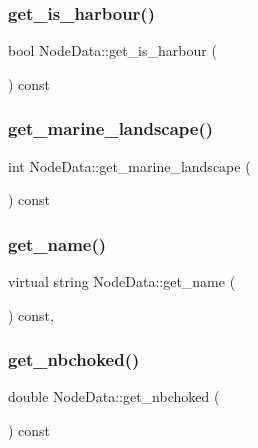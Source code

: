 \subsubsection{\texorpdfstring{get\_is\_harbour()}{get\_is\_harbour()}}
{\footnotesize\ttfamily bool Node\+Data\+::get\+\_\+is\+\_\+harbour (\begin{DoxyParamCaption}{ }\end{DoxyParamCaption}) const\hspace{0.3cm}{\ttfamily [inline]}}

\mbox{\label{class_node_data_a56ca73b90c6526c96359cd0869358ccc}} 
\subsubsection{\texorpdfstring{get\_marine\_landscape()}{get\_marine\_landscape()}}
{\footnotesize\ttfamily int Node\+Data\+::get\+\_\+marine\+\_\+landscape (\begin{DoxyParamCaption}{ }\end{DoxyParamCaption}) const\hspace{0.3cm}{\ttfamily [inline]}}

\mbox{\label{class_node_data_a2b2db7fa4779d369f8c667171d18dbad}} 
\subsubsection{\texorpdfstring{get\_name()}{get\_name()}}
{\footnotesize\ttfamily virtual string Node\+Data\+::get\+\_\+name (\begin{DoxyParamCaption}{ }\end{DoxyParamCaption}) const\hspace{0.3cm}{\ttfamily [inline]}, {\ttfamily [virtual]}}

\mbox{\label{class_node_data_abb730bf1ca3746720aee82026c412188}} 
\subsubsection{\texorpdfstring{get\_nbchoked()}{get\_nbchoked()}}
{\footnotesize\ttfamily double Node\+Data\+::get\+\_\+nbchoked (\begin{DoxyParamCaption}{ }\end{DoxyParamCaption}) const\hspace{0.3cm}{\ttfamily [inline]}}

